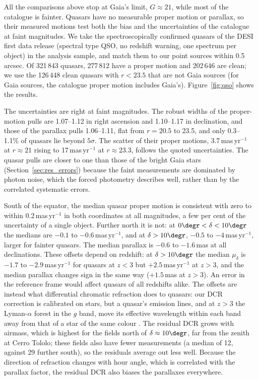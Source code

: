 \documentclass[usenatbib]{mnras}   %
\begin{document}
All the comparisons above stop at Gaia's limit, $G \approx 21$, while most of the catalogue is fainter. Quasars have no measurable proper motion or parallax, so their measured motions test both the bias and the uncertainties of the catalogue at faint magnitudes. We take the spectroscopically confirmed quasars of the DESI first data release \citep{DESI_DR1} (spectral type QSO, no redshift warning, one spectrum per object) in the analysis sample, and match them to our point sources within 0.5\,arcsec. Of 321\,843 quasars, 277\,812 have a proper motion and 202\,646 are clean; we use the 126\,448 clean quasars with $r < 23.5$ that are not Gaia sources (for Gaia sources, the catalogue proper motion includes Gaia's). Figure~\ref{fig:qso} shows the results.

The uncertainties are right at faint magnitudes. The robust widths of the proper-motion pulls are 1.07--1.12 in right ascension and 1.10--1.17 in declination, and those of the parallax pulls 1.06--1.11, flat from $r = 20.5$ to 23.5, and only 0.3--1.1\% of quasars lie beyond $5\sigma$. The scatter of their proper motions, 3.7\,mas\,yr$^{-1}$ at $r \approx 21$ rising to 17\,mas\,yr$^{-1}$ at $r \approx 23.3$, follows the quoted uncertainties. The quasar pulls are closer to one than those of the bright Gaia stars (Section~\ref{sec:res_errors}) because the faint measurements are dominated by photon noise, which the forced photometry describes well, rather than by the correlated systematic errors.

South of the equator, the median quasar proper motion is consistent with zero to within 0.2\,mas\,yr$^{-1}$ in both coordinates at all magnitudes, a few per cent of the uncertainty of a single object. Further north it is not: at $0\degr < \delta < 10\degr$ the medians are $-0.1$ to $-0.6$\,mas\,yr$^{-1}$, and at $\delta > 10\degr$, $-0.5$ to $-4$\,mas\,yr$^{-1}$, larger for fainter quasars. The median parallax is $-0.6$ to $-1.6$\,mas at all declinations. These offsets depend on redshift: at $\delta > 10\degr$ the median $\mu_\delta$ is $-1.7$ to $-2.9$\,mas\,yr$^{-1}$ for quasars at $z < 3$ but $+2.5$\,mas\,yr$^{-1}$ at $z > 3$, and the median parallax changes sign in the same way ($+1.5$\,mas at $z > 3$). An error in the reference frame would affect quasars of all redshifts alike. The offsets are instead what differential chromatic refraction does to quasars: our DCR correction is calibrated on stars, but a quasar's emission lines, and at $z > 3$ the Lyman-$\alpha$ forest in the $g$ band, move its effective wavelength within each band away from that of a star of the same colour \citep{Kaczmarczik2009}. The residual DCR grows with airmass, which is highest for the fields north of $\delta \approx 10\degr$, far from the zenith at Cerro Tololo; these fields also have fewer measurements (a median of 12, against 29 further south), so the residuals average out less well. Because the direction of refraction changes with hour angle, which is correlated with the parallax factor, the residual DCR also biases the parallaxes everywhere.
\end{document}
